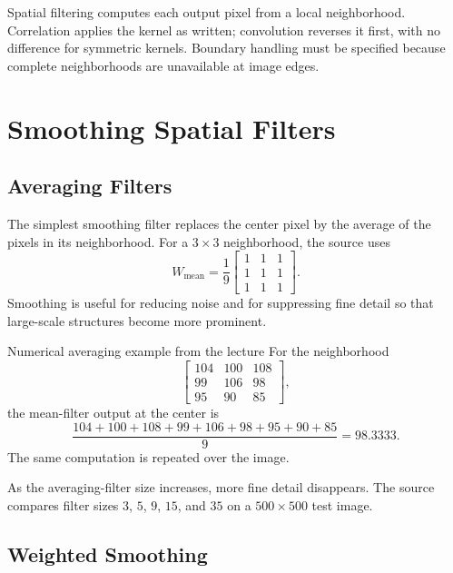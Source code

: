 \documentclass[11pt,a4paper,oneside]{report}
\begin{document}


\FloatBarrier
\begin{chaptersummary}
Spatial filtering computes each output pixel from a local neighborhood. Correlation applies the kernel as written; convolution reverses it first, with no difference for symmetric kernels. Boundary handling must be specified because complete neighborhoods are unavailable at image edges.
\end{chaptersummary}

\chapter{Smoothing Spatial Filters}

\section{Averaging Filters}

The simplest smoothing filter replaces the center pixel by the average of the pixels in its neighborhood. For a $3\times3$ neighborhood, the source uses
\[
W_{\mathrm{mean}}=\frac{1}{9}
\begin{bmatrix}
1&1&1\\1&1&1\\1&1&1
\end{bmatrix}.
\]
Smoothing is useful for reducing noise and for suppressing fine detail so that large-scale structures become more prominent.

\begin{examplebox}{Numerical averaging example from the lecture}
For the neighborhood
\[
\begin{bmatrix}
104&100&108\\
99&106&98\\
95&90&85
\end{bmatrix},
\]
the mean-filter output at the center is
\[
\frac{104+100+108+99+106+98+95+90+85}{9}=98.3333.
\]
The same computation is repeated over the image.
\end{examplebox}

As the averaging-filter size increases, more fine detail disappears. The source compares filter sizes $3$, $5$, $9$, $15$, and $35$ on a $500\times500$ test image.



\section{Weighted Smoothing}
\end{document}

